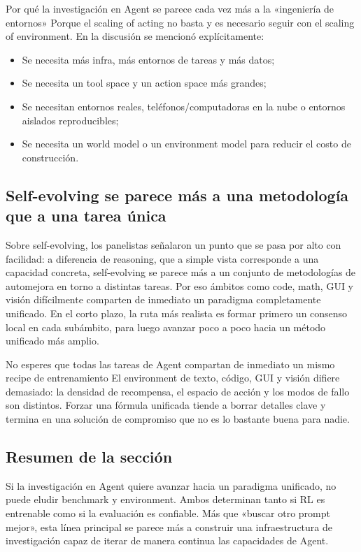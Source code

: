 \begin{knowledgebox}{Por qué la investigación en Agent se parece cada vez más a la «ingeniería de entornos»}
Porque el scaling of acting no basta y es necesario seguir con el scaling of environment. En la discusión se mencionó explícitamente:
\begin{itemize}
  \item Se necesita más infra, más entornos de tareas y más datos;
  \item Se necesita un tool space y un action space más grandes;
  \item Se necesitan entornos reales, teléfonos/computadoras en la nube o entornos aislados reproducibles;
  \item Se necesita un world model o un environment model para reducir el costo de construcción.
\end{itemize}
\end{knowledgebox}

\subsection{Self-evolving se parece más a una metodología que a una tarea única}
Sobre self-evolving, los panelistas señalaron un punto que se pasa por alto con facilidad: a diferencia de reasoning, que a simple vista corresponde a una capacidad concreta, self-evolving se parece más a un conjunto de metodologías de automejora en torno a distintas tareas. Por eso ámbitos como code, math, GUI y visión difícilmente comparten de inmediato un paradigma completamente unificado. En el corto plazo, la ruta más realista es formar primero un consenso local en cada subámbito, para luego avanzar poco a poco hacia un método unificado más amplio.

\begin{warningbox}{No esperes que todas las tareas de Agent compartan de inmediato un mismo recipe de entrenamiento}
El environment de texto, código, GUI y visión difiere demasiado: la densidad de recompensa, el espacio de acción y los modos de fallo son distintos. Forzar una fórmula unificada tiende a borrar detalles clave y termina en una solución de compromiso que no es lo bastante buena para nadie.
\end{warningbox}

\subsection{Resumen de la sección}
Si la investigación en Agent quiere avanzar hacia un paradigma unificado, no puede eludir benchmark y environment. Ambos determinan tanto si RL es entrenable como si la evaluación es confiable. Más que «buscar otro prompt mejor», esta línea principal se parece más a construir una infraestructura de investigación capaz de iterar de manera continua las capacidades de Agent.

